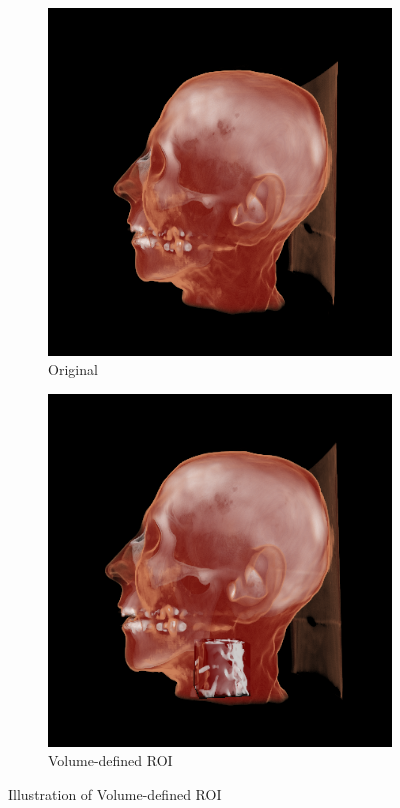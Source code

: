 \begin{figure}
\centering
\begin{subfigure}{0.6\textwidth}
  \centering
  \includegraphics[width=0.9\linewidth]{Images/NON-VOI.png}
  \caption{Original }
  \label{fig:sub1}
\end{subfigure}
\begin{subfigure}{0.6\textwidth}
  \centering
  \includegraphics[width=0.9\linewidth]{Images/VOI.png}
  \caption{Volume-defined ROI}
  \label{fig:sub2}
\end{subfigure}
\label{fig:test}
\caption{Illustration of Volume-defined ROI}
\end{figure}


   


